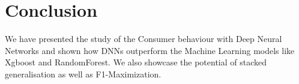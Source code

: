 \section{Conclusion}
We have presented the study of the Consumer behaviour with Deep Neural Networks and shown how
DNNs outperform the Machine Learning models like Xgboost and RandomForest. We also showcase the 
potential of stacked generalisation as well as F1-Maximization.